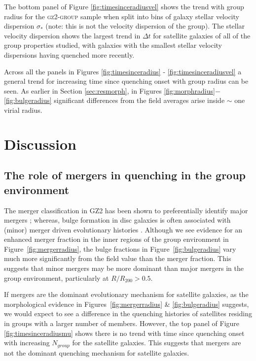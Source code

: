 The bottom panel of Figure \ref{fig:timesinceradiusvel} shows the trend with group radius for the \textsc{gz2-group} sample when split into bins of galaxy stellar velocity dispersion $\sigma_*$ (note: this is not the velocity dispersion of the group). The stellar velocity dispersion shows the largest trend in $\Delta t$ for satellite galaxies of all of the group properties studied, with galaxies with the smallest stellar velocity dispersions having quenched more recently.

Across all the panels in Figures \ref{fig:timesinceradius} - \ref{fig:timesinceradiusvel} a general trend for increasing time since quenching onset with group radius can be seen. As earlier in Section \ref{sec:resmorph}, in Figures \ref{fig:morphradius}$-$\ref{fig:bulgeradius} significant differences from the field averages arise inside $\sim$ one virial radius. 


\section{Discussion}\label{sec:disc}

\subsection{The role of mergers in quenching in the group environment}\label{sec:rolemergerenv}

The merger classification in GZ2 has been shown to preferentially identify major mergers \citep{Darg10a}; whereas, bulge formation in disc galaxies is often associated with (minor) merger driven evolutionary histories \citep{croton06, tonini16}.  Although we see evidence for an enhanced merger fraction in the inner regions of the group environment in Figure~\ref{fig:mergerradius}, the bulge fractions in Figure~\ref{fig:bulgeradius} vary much more significantly from the field value than the merger fraction. This suggests that minor mergers may be more dominant than major mergers in the group environment, particularly at $R/R_{200} > 0.5$. 

If mergers are the dominant evolutionary mechanism for satellite galaxies, as the morphological evidence in Figures~\ref{fig:mergerradius} \& \ref{fig:bulgeradius} suggests, we would expect to see a difference in the quenching histories of satellites residing in groups with a larger number of members. However, the top panel of Figure \ref{fig:timesinceradiusmu} shows there is no trend with time since quenching onset with increasing $N_{group}$ for the satellite galaxies. This suggests that mergers are not the dominant quenching mechanism for satellite galaxies.

